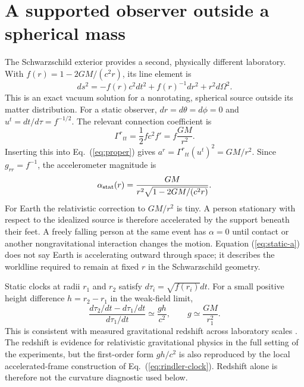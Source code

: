 \documentclass[11pt,letterpaper]{article}
\begin{document}
\section{A supported observer outside a spherical mass}

The Schwarzschild exterior provides a second, physically different laboratory. With $f(r)=1-2GM/(c^2r)$, its line element is
\begin{equation}
 ds^2=-f(r)c^2dt^2+f(r)^{-1}dr^2+r^2d\Omega^2 .
 \label{eq:schwarzschild}
\end{equation}
This is an exact vacuum solution for a nonrotating, spherical source outside its matter distribution. For a static observer, $dr=d\theta=d\phi=0$ and $u^t=dt/d\tau=f^{-1/2}$. The relevant connection coefficient is
\begin{equation}
 \Gamma^{r}{}_{tt}=\frac{1}{2}f c^2 f'=f\frac{GM}{r^2} .
 \label{eq:christoffel}
\end{equation}
Inserting this into Eq.~(\ref{eq:proper}) gives $a^r=\Gamma^r{}_{tt}(u^t)^2=GM/r^2$. Since $g_{rr}=f^{-1}$, the accelerometer magnitude is
\begin{equation}
 \alpha_{\rm stat}(r)=\frac{GM}{r^2\sqrt{1-2GM/(c^2r)}}.
 \label{eq:static-a}
\end{equation}
For Earth the relativistic correction to $GM/r^2$ is tiny. A person stationary with respect to the idealized source is therefore accelerated by the support beneath their feet. A freely falling person at the same event has $\alpha=0$ until contact or another nongravitational interaction changes the motion. Equation (\ref{eq:static-a}) does not say Earth is accelerating outward through space; it describes the worldline required to remain at fixed $r$ in the Schwarzschild geometry.

Static clocks at radii $r_1$ and $r_2$ satisfy $d\tau_i=\sqrt{f(r_i)}dt$. For a small positive height difference $h=r_2-r_1$ in the weak-field limit,
\begin{equation}
 \frac{d\tau_2/dt-d\tau_1/dt}{d\tau_1/dt}
 \simeq \frac{gh}{c^2},\qquad g\simeq\frac{GM}{r_1^2}.
 \label{eq:redshift}
\end{equation}
This is consistent with measured gravitational redshift across laboratory scales \cite{Bothwell,Zheng}. The redshift is evidence for relativistic gravitational physics in the full setting of the experiments, but the first-order form $gh/c^2$ is also reproduced by the local accelerated-frame construction of Eq.~(\ref{eq:rindler-clock}). Redshift alone is therefore not the curvature diagnostic used below.
\end{document}
